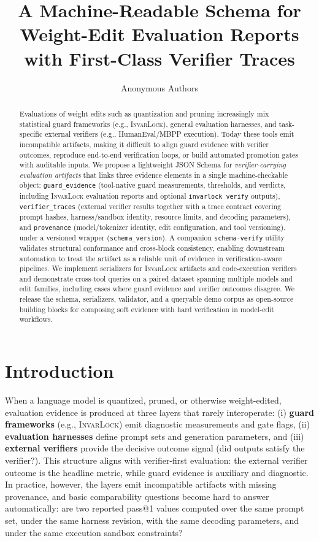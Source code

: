 \documentclass{article} %
\title{A Machine-Readable Schema for Weight-Edit Evaluation Reports\\with First-Class Verifier Traces}
\author{Anonymous Authors}
\newcommand{\invarlock}{\textsc{InvarLock}\xspace}
\newcommand{\schemaverify}{\texttt{schema-verify}\xspace}
\begin{document}
\maketitle

\begin{abstract}
Evaluations of weight edits such as quantization and pruning increasingly mix
statistical guard frameworks (e.g., \invarlock), general evaluation harnesses,
and task-specific external verifiers (e.g., HumanEval/MBPP execution).
Today these tools emit incompatible artifacts, making it difficult to align guard
evidence with verifier outcomes, reproduce end-to-end verification loops, or
build automated promotion gates with auditable inputs.
We propose a lightweight JSON Schema for \emph{verifier-carrying evaluation artifacts}
that links three evidence elements in a single machine-checkable object:
\texttt{guard\_evidence} (tool-native guard measurements, thresholds, and verdicts,
including \invarlock evaluation reports and optional \texttt{invarlock verify} outputs),
\texttt{verifier\_traces} (external verifier results together with a trace contract
covering prompt hashes, harness/sandbox identity, resource limits, and decoding
parameters), and \texttt{provenance} (model/tokenizer identity, edit configuration, and
tool versioning), under a versioned wrapper (\texttt{schema\_version}).
A companion \schemaverify utility validates structural conformance and cross-block
consistency, enabling downstream automation to treat the artifact as a reliable unit
of evidence in verification-aware pipelines.
We implement serializers for \invarlock artifacts and code-execution verifiers and
demonstrate cross-tool queries on a paired dataset spanning multiple models and edit
families, including cases where guard evidence and verifier outcomes disagree.
We release the schema, serializers, validator, and a queryable demo corpus as open-source
building blocks for composing soft evidence with hard verification in model-edit workflows.
\end{abstract}

\section{Introduction}
When a language model is quantized, pruned, or otherwise weight-edited, evaluation evidence is
produced at three layers that rarely interoperate:
(i) \textbf{guard frameworks} (e.g., \invarlock) emit diagnostic measurements and gate flags,
(ii) \textbf{evaluation harnesses} define prompt sets and generation parameters,
and (iii) \textbf{external verifiers} provide the decisive outcome signal (did outputs satisfy the
verifier?).
This structure aligns with verifier-first evaluation: the external verifier outcome is the
headline metric, while guard evidence is auxiliary and diagnostic.
In practice, however, the layers emit incompatible artifacts with missing provenance, and basic
comparability questions become hard to answer automatically:
are two reported pass@1 values computed over the same prompt set, under the same harness revision,
with the same decoding parameters, and under the same execution sandbox constraints?
\end{document}
